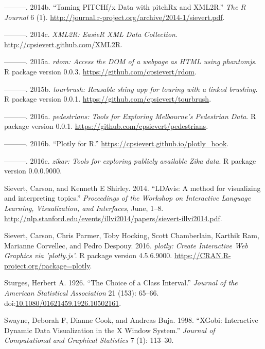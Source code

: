 \documentclass[12pt,]{isuthesis}
\begin{document}
\hypertarget{ref-Sievert:2014a}{}
---------. 2014b. ``Taming PITCHf/x Data with pitchRx and XML2R.''
\emph{The R Journal} 6 (1).
\url{http://journal.r-project.org/archive/2014-1/sievert.pdf}.

\hypertarget{ref-XML2R}{}
---------. 2014c. \emph{XML2R: EasieR XML Data Collection}.
\url{http://cpsievert.github.com/XML2R}.

\hypertarget{ref-rdom}{}
---------. 2015a. \emph{rdom: Access the DOM of a webpage as HTML using
phantomjs}. R package version 0.0.3.
\url{https://github.com/cpsievert/rdom}.

\hypertarget{ref-tourbrush}{}
---------. 2015b. \emph{tourbrush: Reusable shiny app for touring with a
linked brushing}. R package version 0.0.1.
\url{https://github.com/cpsievert/tourbrush}.

\hypertarget{ref-pedestrians}{}
---------. 2016a. \emph{pedestrians: Tools for Exploring Melbourne's
Pedestrian Data}. R package version 0.0.1.
\url{https://github.com/cpsievert/pedestrians}.

\hypertarget{ref-plotly-book}{}
---------. 2016b. ``Plotly for R.''
\url{https://cpsievert.github.io/plotly_book}.

\hypertarget{ref-zikar}{}
---------. 2016c. \emph{zikar: Tools for exploring publicly available
Zika data}. R package version 0.0.0.9000.

\hypertarget{ref-Sievert:2014b}{}
Sievert, Carson, and Kenneth E Shirley. 2014. ``LDAvis: A method for
visualizing and interpreting topics.'' \emph{Proceedings of the Workshop
on Interactive Language Learning, Visualization, and Interfaces}, June,
1--8.
\url{http://nlp.stanford.edu/events/illvi2014/papers/sievert-illvi2014.pdf}.

\hypertarget{ref-plotly}{}
Sievert, Carson, Chris Parmer, Toby Hocking, Scott Chamberlain, Karthik
Ram, Marianne Corvellec, and Pedro Despouy. 2016. \emph{plotly: Create
Interactive Web Graphics via 'plotly.js'}. R package version 4.5.6.9000.
\url{https://CRAN.R-project.org/package=plotly}.

\hypertarget{ref-Sturges}{}
Sturges, Herbert A. 1926. ``The Choice of a Class Interval.''
\emph{Journal of the American Statistical Association} 21 (153): 65--66.
doi:\href{https://doi.org/10.1080/01621459.1926.10502161}{10.1080/01621459.1926.10502161}.

\hypertarget{ref-xgobi}{}
Swayne, Deborah F, Dianne Cook, and Andreas Buja. 1998. ``XGobi:
Interactive Dynamic Data Visualization in the X Window System.''
\emph{Journal of Computational and Graphical Statistics} 7 (1): 113--30.
\end{document}
